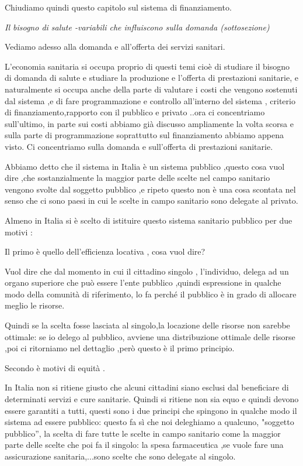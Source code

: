 \documentclass[]{article}
\begin{document}
Chiudiamo quindi questo capitolo sul sistema di finanziamento.

\emph{Il bisogno di salute -variabili che influiscono sulla domanda
(sottosezione)}

Vediamo adesso alla domanda e all'offerta dei servizi sanitari.

L'economia sanitaria si occupa proprio di questi temi cioè di studiare
il bisogno di domanda di salute e studiare la produzione e l'offerta di
prestazioni sanitarie, e naturalmente si occupa anche della parte di
valutare i costi che vengono sostenuti dal sistema ,e di fare
programmazione e controllo all'interno del sistema , criterio di
finanziamento,rapporto con il pubblico e privato ..ora ci concentriamo
sull'ultimo, in parte sui costi abbiamo già discusso ampliamente la
volta scorsa e sulla parte di programmazione soprattutto sul
finanziamento abbiamo appena visto. Ci concentriamo sulla domanda e
sull'offerta di prestazioni sanitarie.

Abbiamo detto che il sistema in Italia è un sistema pubblico ,questo
cosa vuol dire ,che sostanzialmente la maggior parte delle scelte nel
campo sanitario vengono svolte dal soggetto pubblico ,e ripeto questo
non è una cosa scontata nel senso che ci sono paesi in cui le scelte in
campo sanitario sono delegate al privato.

Almeno in Italia si è scelto di istituire questo sistema sanitario
pubblico per due motivi :

Il primo è quello dell'efficienza locativa , cosa vuol dire?

Vuol dire che dal momento in cui il cittadino singolo , l'individuo,
delega ad un organo superiore che può essere l'ente pubblico ,quindi
espressione in qualche modo della comunità di riferimento, lo fa perché
il pubblico è in grado di allocare meglio le risorse.

Quindi se la scelta fosse lasciata al singolo,la locazione delle risorse
non sarebbe ottimale: se io delego al pubblico, avviene una
distribuzione ottimale delle risorse ,poi ci ritorniamo nel dettaglio
,però questo è il primo principio.

Secondo è motivi di equità .

In Italia non si ritiene giusto che alcuni cittadini siano esclusi dal
beneficiare di determinati servizi e cure sanitarie. Quindi si ritiene
non sia equo e quindi devono essere garantiti a tutti, questi sono i due
principi che spingono in qualche modo il sistema ad essere pubblico:
questo fa sì che noi deleghiamo a qualcuno, "soggetto pubblico'', la
scelta di fare tutte le scelte in campo sanitario come la maggior parte
delle scelte che poi fa il singolo: la spesa farmaceutica ,se vuole fare
una assicurazione sanitaria,...sono scelte che sono delegate al singolo.
\end{document}
